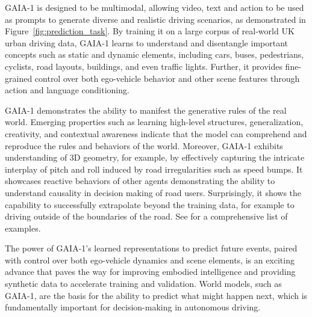GAIA-1 is designed to be multimodal, allowing video, text and action to be used as prompts to generate diverse and realistic driving scenarios, as demonstrated in Figure~\ref{fig:prediction_task}. By training it on a large corpus of real-world UK urban driving data, GAIA-1 learns to understand and disentangle important concepts such as static and dynamic elements, including cars, buses, pedestrians, cyclists, road layouts, buildings, and even traffic lights. Further, it provides fine-grained control over both ego-vehicle behavior and other scene features through action and language conditioning.

GAIA-1 demonstrates the ability to manifest the generative rules of the real world. Emerging properties such as learning high-level structures, generalization, creativity, and contextual awareness indicate that the model can comprehend and reproduce the rules and behaviors of the world. Moreover, GAIA-1 exhibits understanding of 3D geometry, for example, by effectively capturing the intricate interplay of pitch and roll induced by road irregularities such as speed bumps. It showcases reactive behaviors of other agents demonstrating the ability to understand causality in decision making of road users. Surprisingly, it shows the capability to successfully extrapolate beyond the training data, for example to driving outside of the boundaries of the road. See  for a comprehensive list of examples.

The power of GAIA-1's learned representations to predict future events, paired with control over both ego-vehicle dynamics and scene elements, is an exciting advance that paves the way for improving embodied intelligence and providing synthetic data to accelerate training and validation. World models, such as GAIA-1, are the basis for the ability to predict what might happen next, which is fundamentally important for decision-making in autonomous driving.
